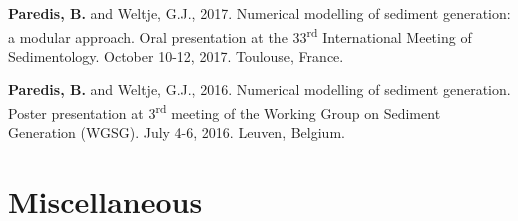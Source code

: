     \textbf{Paredis, B.} and Weltje, G.J., %
    2017. %
    Numerical modelling of sediment generation: a modular approach. %
    Oral presentation at the 33\textsuperscript{rd} International Meeting of Sedimentology. %
    October 10-12, 2017. %
    Toulouse, France. %

    \textbf{Paredis, B.} and Weltje, G.J., %
    2016. %
    Numerical modelling of sediment generation. %
    Poster presentation at 3\textsuperscript{rd} meeting of the Working Group on Sediment Generation (WGSG). %
    July 4-6, 2016. %
    Leuven, Belgium. %


\section*{Miscellaneous}

\nonfrenchspacing


\cleardoublepage

